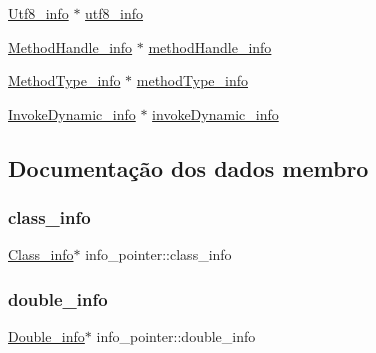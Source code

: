 \begin{DoxyCompactItemize}
\item 
\hyperlink{struct_utf8__info}{Utf8\+\_\+info} $\ast$ \hyperlink{unioninfo__pointer_a7a08700f711c4dbc7cbfeadb6b8fa4c2}{utf8\+\_\+info}
\item 
\hyperlink{struct_method_handle__info}{Method\+Handle\+\_\+info} $\ast$ \hyperlink{unioninfo__pointer_aded37473be29ff4ed1b1b6acbeb869f6}{method\+Handle\+\_\+info}
\item 
\hyperlink{struct_method_type__info}{Method\+Type\+\_\+info} $\ast$ \hyperlink{unioninfo__pointer_a87ced2262cbee8291ed014fe299c0aeb}{method\+Type\+\_\+info}
\item 
\hyperlink{struct_invoke_dynamic__info}{Invoke\+Dynamic\+\_\+info} $\ast$ \hyperlink{unioninfo__pointer_a17bd96c4e69cb0ccc7ea002320498e5c}{invoke\+Dynamic\+\_\+info}
\end{DoxyCompactItemize}


\subsection{Documentação dos dados membro}
\mbox{\label{unioninfo__pointer_a2503ced8dac13ac48042f8b88d39cad1}} 
\subsubsection{\texorpdfstring{class\+\_\+info}{class\_info}}
{\footnotesize\ttfamily \hyperlink{struct_class__info}{Class\+\_\+info}$\ast$ info\+\_\+pointer\+::class\+\_\+info}

\mbox{\label{unioninfo__pointer_a9609953889d0cb1fd1b2909cb98eb573}} 
\subsubsection{\texorpdfstring{double\+\_\+info}{double\_info}}
{\footnotesize\ttfamily \hyperlink{struct_double__info}{Double\+\_\+info}$\ast$ info\+\_\+pointer\+::double\+\_\+info}

\mbox{\label{unioninfo__pointer_a85482dc8d14195f18c1de44d2dc833e7}} 
